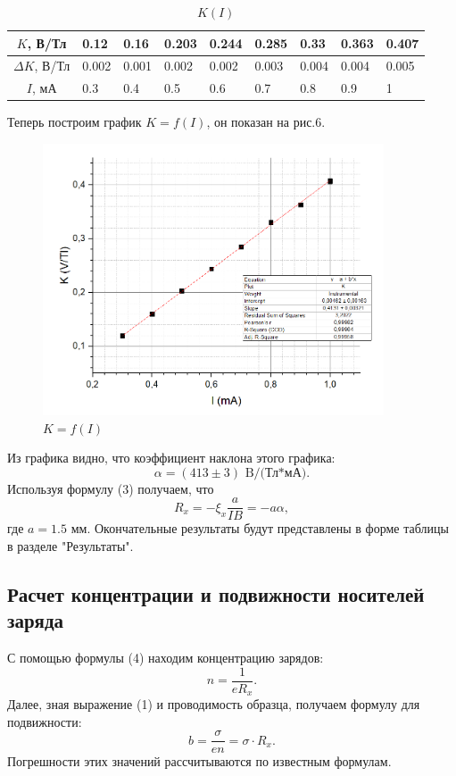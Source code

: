 \documentclass[a4paper, 14pt]{extarticle}%
\newcommand\ECaption[1]{%
     \captionsetup{font=footnotesize}%
     \caption{#1}}
\begin{document}
\begin{table}[h!]
\begin{center}
\begin{tabular}{|c|l|l|l|l|l|l|l|l|}
\hline
\rowcolor[HTML]{FFFFC7} 
$K$, В/Тл        & 0.12  & 0.16  & 0.203 & 0.244 & 0.285 & 0.33  & 0.363 & 0.407 \\ \hline
$\Delta K$, В/Тл & 0.002 & 0.001 & 0.002 & 0.002 & 0.003 & 0.004 & 0.004 & 0.005 \\ \hline
\rowcolor[HTML]{FFFFC7} 
$I$, мА        & 0.3   & 0.4   & 0.5   & 0.6   & 0.7   & 0.8   & 0.9   & 1     \\ \hline
\end{tabular}
\end{center}
\ECaption{$K(I)$}
\end{table}
Теперь построим график $K=f(I)$, он показан на рис.6.
\begin{figure}[h!]
\begin{center}
\includegraphics[width=0.9\textwidth]{grki}
\end{center}
\ECaption{$K=f(I)$}
\end{figure}
Из графика видно, что коэффициент наклона этого графика:
\begin{equation}
\alpha=(413\pm3)\text{ B/(Тл*мА)}.
\end{equation}
Используя формулу (3) получаем, что 
\begin{equation}
R_x=-\xi_x\dfrac{a}{IB} = -a\alpha,
\end{equation}
где $a = 1.5$ мм. Окончательные результаты будут представлены в форме таблицы в разделе "Результаты".
\subsection*{Расчет концентрации и подвижности носителей заряда}
С помощью формулы (4) находим концентрацию зарядов:
\begin{equation}
n = \dfrac{1}{eR_x}.
\end{equation}
Далее, зная выражение (1) и проводимость образца, получаем формулу для подвижности:
\begin{equation}
b = \dfrac{\sigma}{en}=\sigma\cdot R_x.
\end{equation}
Погрешности этих значений рассчитываются по известным формулам.
\end{document}
